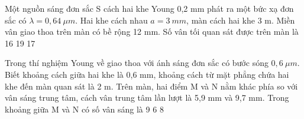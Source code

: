 \begin{vidu}%
Một nguồn sáng đơn sắc S cách hai khe Young 0,2 mm phát ra một bức xạ đơn sắc có $\lambda =0,64\ \mu m$. Hai khe cách nhau $a=3\ mm$, màn cách hai khe 3 m. Miền vân giao thoa trên màn có bề rộng 12 mm. Số vân tối quan sát được trên màn là
\choice
{16}
{}
{19}
{17}
\end{vidu} 
\begin{vidu}%
 Trong thí nghiệm Young về giao thoa với ánh sáng đơn sắc có bước sóng $0,6\ \mu m$. Biết khoảng cách giữa hai khe là 0,6 mm, khoảng cách từ mặt phẳng chứa hai khe đến màn quan sát là 2 m. Trên màn, hai điểm M và N nằm khác phía so với vân sáng trung tâm, cách vân trung tâm lần lượt là 5,9 mm và 9,7 mm. Trong khoảng giữa M và N có số vân sáng là
\choice
{9}
{}
{6}
{8}
\end{vidu} 
